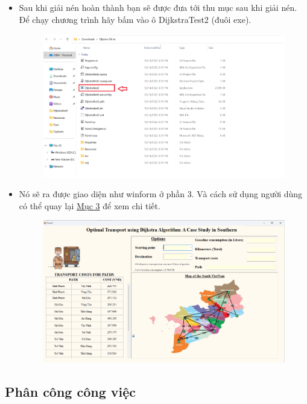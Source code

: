 \documentclass[a4paper]{article}
\begin{document}
\begin{itemize}
    \item Sau khi giải nén hoàn thành bạn sẽ được đưa tới thu mục sau khi giải nén. Để chạy chương trình hãy bấm vào ô DijkstraTest2 (đuôi exe).
    
    \begin{figure}[!ht]
        \centering
        \includegraphics[width=15cm]{5.5.png}
    \end{figure}
    
    \item Nó sẽ ra được giao diện như winform ở phần 3. Và cách sử dụng người dùng có thể quay lại \hyperref[p3]{Mục 3} để xem chi tiết.
    
    \begin{figure}[!ht]
        \centering
        \includegraphics[width=15cm]{5.6.png}
    \end{figure}
\end{itemize}

\subsection{Phân công công việc}
\end{document}
